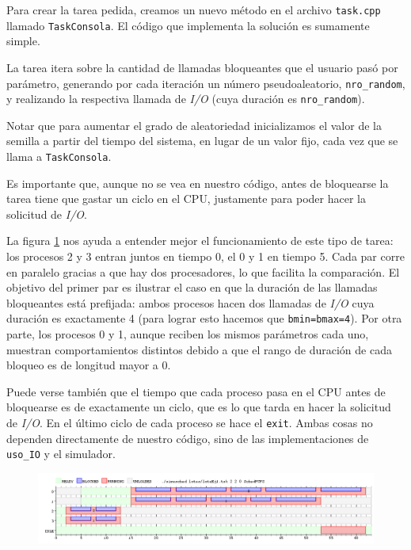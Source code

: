 Para crear la tarea pedida, creamos un nuevo método en el archivo \texttt{task.cpp} llamado \texttt{TaskConsola}. El código que implementa la solución es sumamente simple.

La tarea itera sobre la cantidad de llamadas bloqueantes que el usuario pasó por parámetro, generando por cada iteración un número pseudoaleatorio, \texttt{nro\_random}, y realizando la respectiva llamada de \emph{I/O} (cuya duración es \texttt{nro\_random}).

Notar que para aumentar el grado de aleatoriedad inicializamos el valor de la semilla a partir del tiempo del sistema, en lugar de un valor fijo, cada vez que se llama a \texttt{TaskConsola}.

Es importante que, aunque no se vea en nuestro código, antes de bloquearse la tarea tiene que gastar un ciclo en el CPU, justamente para poder hacer la solicitud de \emph{I/O}.

La figura \ref{fig:ej1} nos ayuda a entender mejor el funcionamiento de este tipo de tarea: los procesos 2 y 3 entran juntos en tiempo 0, el 0 y 1 en tiempo 5. Cada par corre en paralelo gracias a que hay dos procesadores, lo que facilita la comparación. El objetivo del primer par es ilustrar el caso en que la duración de las llamadas bloqueantes está prefijada: ambos procesos hacen dos llamadas de \emph{I/O} cuya duración es exactamente 4 (para lograr esto hacemos que \texttt{bmin=bmax=4}). Por otra parte, los procesos 0 y 1, aunque reciben los mismos parámetros cada uno, muestran comportamientos distintos debido a que el rango de duración de cada bloqueo es de longitud mayor a 0. 

Puede verse también que el tiempo que cada proceso pasa en el CPU antes de bloquearse es de exactamente un ciclo, que es lo que tarda en hacer la solicitud de \emph{I/O}. En el último ciclo de cada proceso se hace el \texttt{exit}. Ambas cosas no dependen directamente de nuestro código, sino de las implementaciones de \texttt{uso\_IO} y el simulador. 


\begin{figure}[H]
  \centering
  \includegraphics[width=\textwidth]{img/imgEj1-1.png}
  \caption{}
  \label{fig:ej1}
\end{figure}